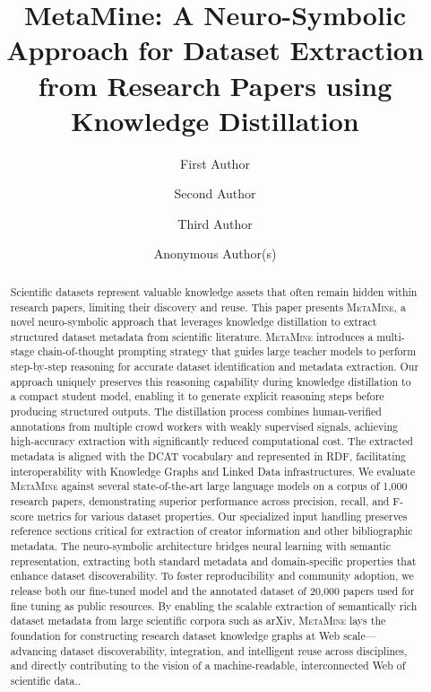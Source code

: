 \documentclass[runningheads]{llncs}
\begin{document}
%
\title{MetaMine: A Neuro-Symbolic Approach for Dataset Extraction from Research Papers using Knowledge Distillation}
%
%
\author{First Author \and
Second Author \and
Third Author}
%
%
\author{Anonymous Author(s)}
%
\maketitle              %
%
\begin{abstract}
Scientific datasets represent valuable knowledge assets that often remain hidden within research papers, limiting their discovery and reuse. This paper presents \textsc{MetaMine}, a novel neuro-symbolic approach that leverages knowledge distillation to extract structured dataset metadata from scientific literature. \textsc{MetaMine} introduces a multi-stage chain-of-thought prompting strategy that guides large teacher models to perform step-by-step reasoning for accurate dataset identification and metadata extraction. Our approach uniquely preserves this reasoning capability during knowledge distillation to a compact student model, enabling it to generate explicit reasoning steps before producing structured outputs. The distillation process combines human-verified annotations from multiple crowd workers with weakly supervised signals, achieving high-accuracy extraction with significantly reduced computational cost. The extracted metadata is aligned with the DCAT vocabulary and represented in RDF, facilitating interoperability with Knowledge Graphs and Linked Data infrastructures. We evaluate \textsc{MetaMine} against several state-of-the-art large language models on a corpus of 1,000 research papers, demonstrating superior performance across precision, recall, and F-score metrics for various dataset properties. Our specialized input handling preserves reference sections critical for extraction of creator information and other bibliographic metadata. The neuro-symbolic architecture bridges neural learning with semantic representation, extracting both standard metadata and domain-specific properties that enhance dataset discoverability. To foster reproducibility and community adoption, we release both our fine-tuned model and the annotated dataset of 20,000 papers used for fine tuning as public resources. By enabling the scalable extraction of semantically rich dataset metadata from large scientific corpora such as arXiv, \textsc{MetaMine} lays the foundation for constructing research dataset knowledge graphs at Web scale—advancing dataset discoverability, integration, and intelligent reuse across disciplines, and directly contributing to the vision of a machine-readable, interconnected Web of scientific data..

\end{abstract}
%
%
%
\end{document}
